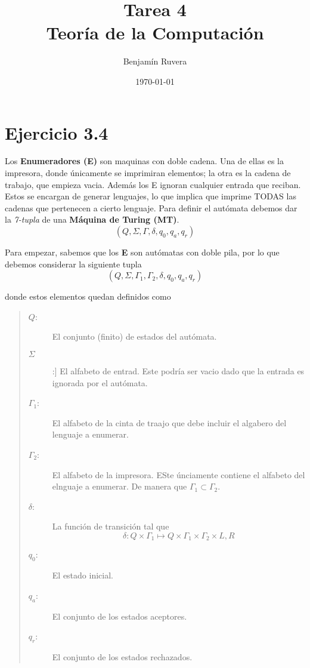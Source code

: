 \documentclass[11pt]{article}
\title{Tarea 4 \\ Teor\'ia de la Computaci\'on}
\author{Benjam\'in Ruvera}
\date{\today}
\begin{document}
\maketitle

\section*{Ejercicio 3.4}

	\par Los \textbf{Enumeradores (E)} son maquinas con doble cadena. Una de ellas es la impresora, donde \'unicamente se imprimiran elementos; la otra es la cadena de trabajo, que empieza vacia. Adem\'as los E ignoran cualquier entrada que reciban. Estos se encargan de generar lenguajes, lo que implica que imprime TODAS las cadenas que pertenecen a cierto lenguaje. Para definir el aut\'omata debemos dar la \textit{7-tupla} de una \textbf{M\'aquina de Turing (MT)}.
	\begin{equation}
		\left(  Q, \Sigma, \Gamma, \delta, q_0, q_a, q_r \right)
		\label{def: MT}
	\end{equation}
	
	\noindent Para empezar, sabemos que los \textbf{E} son aut\'omatas con doble pila, por lo que debemos considerar la siguiente tupla 
	\begin{equation}
		\left( Q, \Sigma, \Gamma_1, \Gamma_2, \delta, q_0, q_a, q_r \right)
	\end{equation}
	
	\noindent donde estos elementos quedan definidos como
	
	\begin{quote}\begin{description}
		\item [$Q$:] El conjunto (finito) de estados del aut\'omata.
		\item [$\Sigma$]:] El alfabeto de entrad. Este podr\'ia ser vacio dado que la entrada es ignorada por el aut\'omata.
		\item [$\Gamma_1$:] El alfabeto de la cinta de traajo que debe incluir el algabero del lenguaje a enumerar.
		\item [$\Gamma_2$:] El alfabeto de la impresora. ESte \'unciamente contiene el alfabeto del elnguaje a enumerar. De manera que $\Gamma_1 \subset \Gamma_2$. 
		\item [$\delta$:] La funci\'on de transici\'on tal que 
			$$ \delta: Q\times\Gamma_1 \mapsto Q\times\Gamma_1\times\Gamma_2\times{L,R} $$
		\item [$q_0$:] El estado inicial.
		\item [$q_a$:] El conjunto de los estados aceptores.
		\item [$q_r$:] El conjunto de los estados rechazados.
	\end{description}\end{quote}
\end{document}
